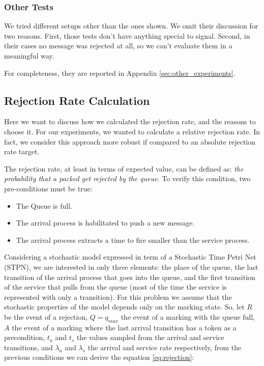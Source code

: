 \subsubsection{Other Tests}
We tried different setups other than the ones shown. We omit their discussion for two reasons. First, those tests don't have anything special to signal. Second, in their cases no message was rejected at all, so we can't evaluate them in a meaningful way.

For completeness, they are reported in Appendix \ref{sec:other_experiments}.

\subsection{Rejection Rate Calculation}
Here we want to discuss how we calculated the rejection rate, and the reasons to choose it. For our experiments, we wanted to calculate a relative rejection rate. In fact, we consider this approach more robust if compared to an absolute rejection rate target.

The rejection rate, at least in terms of expected value, can be defined as: \textit{the probability that a packed get rejected by the queue}. To verify this condition, two pre-conditions must be true:
\begin{itemize}
    \item The Queue is full.
    \item The arrival process is habilitated to push a new message.
    \item The arrival process extracts a time to fire smaller than the service process.
\end{itemize}

Considering a stochastic model expressed in term of a Stochastic Time Petri Net (STPN), we are interested in only three elements: the place of the queue, the last transition of the arrival process that goes into the queue, and the first transition of the service that pulls from the queue (most of the time the service is represented with only a transition). For this problem we assume that the stochastic properties of the model depends only on the marking state. So, let $R$ be the event of a rejection, $Q=q_{max}$ the event of a marking with the queue full, $A$ the event of a marking where the last arrival transition has a token as a precondition, $t_a$ and $t_s$ the values sampled from the arrival and service transitions, and $\lambda_a$ and $\lambda_s$ the arrival and service rate respectively, from the previous conditions we can derive the equation \ref{eq:rejection}:

